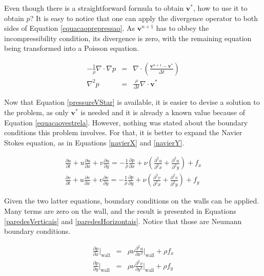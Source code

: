\documentclass[journal]{IEEEtran}
\begin{document}
Even though there is a straightforward formula to obtain $\mathbf{v}^{*}$, how to use it to obtain $p$? It is easy to notice that one can apply the divergence operator to both sides of Equation \ref{equacaoprepressao}. As $\mathbf{v}^{n+1}$ has to obbey the incompressibility condition, its divergence is zero, with the remaining equation being transformed into a Poisson equation.

\begin{eqnarray}
	-\frac{1}{\rho}\nabla\cdot\nabla p\nonumber & = &\nabla\cdot \left(\frac{\textbf{v}^{n+1}-\textbf{v}^*}{\Delta t}\right)\\
\nabla^2 p & = & \frac{\rho}{\Delta t}\nabla\cdot \textbf{v}^{*}	 \label{pressureVStar}
\end{eqnarray}

Now that Equation \ref{pressureVStar} is available, it is easier to devise a solution to the problem, as only $\mathbf{v}^*$ is needed and it is already a known value because of Equation \ref{equacaovestrela}. However, nothing was stated about the boundary conditions this problem involves. For that, it is better to expand the Navier Stokes equation, as in Equations \ref{navierX} and \ref{navierY}.

\begin{eqnarray}
\frac{\partial u}{\partial t}+u\frac{\partial u}{\partial x}+v\frac{\partial
u}{\partial y}=-\frac{1}{\rho}\frac{\partial p}{\partial
x}+\nu\left(\frac{\partial^2 u}{\partial^2 x}+\frac{\partial^2 u}{\partial^2
y}\right)+f_x \label{navierX}\\
\frac{\partial v}{\partial t}+u\frac{\partial v}{\partial x}+v\frac{\partial
v}{\partial y}=-\frac{1}{\rho}\frac{\partial p}{\partial
y}+\nu\left(\frac{\partial^2 v}{\partial^2 x}+\frac{\partial^2 v}{\partial^2
y}\right)+f_y \label{navierY}
\end{eqnarray}

Given the two latter equations, boundary conditions on the walls can be applied. Many terms are zero on the wall, and the result is presented in Equations \ref{paredesVerticais} and \ref{paredesHorizontais}. Notice that those are Neumann boundary conditions.

\begin{eqnarray}
\frac{\partial p}{\partial x}\Bigg|_{\textrm{wall}}&=&\rho\nu\frac{\partial^2
u}{\partial x^2}\Bigg|_{\textrm{wall}}+\rho f_x\label{paredesVerticais}\\
\frac{\partial p}{\partial y}\Bigg|_{\textrm{wall}}&=&\rho\nu\frac{\partial^2
v}{\partial y^2}\Bigg|_{\textrm{wall}}+\rho f_y\label{paredesHorizontais}
\end{eqnarray}
\end{document}
